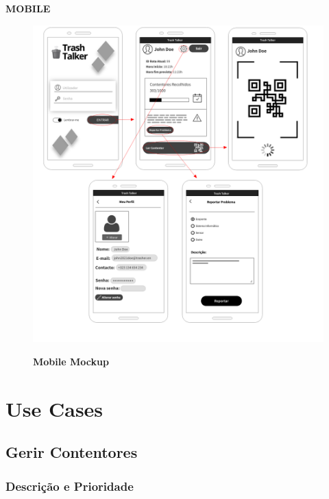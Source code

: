 \documentclass{scrreprt}
\begin{document}
	\newpage
	\begin{Large}
		\begin{center}
			\textbf{MOBILE}
		\end{center}
	\end{Large}
	
	\begin{figure}[H]
		\centering
		\includegraphics[scale=.30]{imagens/MockupMobile}
		\par \textbf{Mobile Mockup}
		\label{fig:MobileMockup}
	\end{figure}
	
	
	{\let\clearpage\relax \chapter{Use Cases}}
	
	\section{Gerir Contentores}
	
	
	\subsection{Descrição e Prioridade}
	
\end{document}
